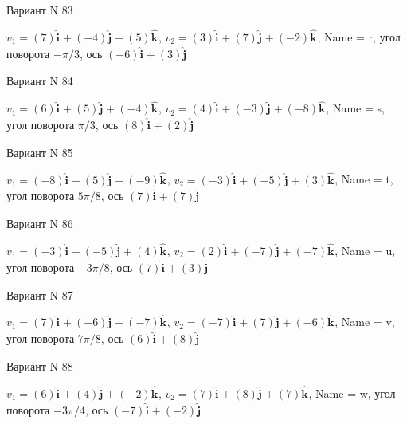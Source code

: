 \documentclass[11pt]{report}
\begin{document}
Вариант N 83

$v_1 = \left(7\right)\mathbf{\hat{i}_{}} + \left(-4\right)\mathbf{\hat{j}_{}} + \left(5\right)\mathbf{\hat{k}_{}}$, $v_2 = \left(3\right)\mathbf{\hat{i}_{}} + \left(7\right)\mathbf{\hat{j}_{}} + \left(-2\right)\mathbf{\hat{k}_{}}$, Name = r, угол поворота $- \pi / 3$, ось $\left(-6\right)\mathbf{\hat{i}_{}} + \left(3\right)\mathbf{\hat{j}_{}}$

Вариант N 84

$v_1 = \left(6\right)\mathbf{\hat{i}_{}} + \left(5\right)\mathbf{\hat{j}_{}} + \left(-4\right)\mathbf{\hat{k}_{}}$, $v_2 = \left(4\right)\mathbf{\hat{i}_{}} + \left(-3\right)\mathbf{\hat{j}_{}} + \left(-8\right)\mathbf{\hat{k}_{}}$, Name = s, угол поворота $\pi / 3$, ось $\left(8\right)\mathbf{\hat{i}_{}} + \left(2\right)\mathbf{\hat{j}_{}}$

Вариант N 85

$v_1 = \left(-8\right)\mathbf{\hat{i}_{}} + \left(5\right)\mathbf{\hat{j}_{}} + \left(-9\right)\mathbf{\hat{k}_{}}$, $v_2 = \left(-3\right)\mathbf{\hat{i}_{}} + \left(-5\right)\mathbf{\hat{j}_{}} + \left(3\right)\mathbf{\hat{k}_{}}$, Name = t, угол поворота $5 \pi / 8$, ось $\left(7\right)\mathbf{\hat{i}_{}} + \left(7\right)\mathbf{\hat{j}_{}}$

Вариант N 86

$v_1 = \left(-3\right)\mathbf{\hat{i}_{}} + \left(-5\right)\mathbf{\hat{j}_{}} + \left(4\right)\mathbf{\hat{k}_{}}$, $v_2 = \left(2\right)\mathbf{\hat{i}_{}} + \left(-7\right)\mathbf{\hat{j}_{}} + \left(-7\right)\mathbf{\hat{k}_{}}$, Name = u, угол поворота $- 3 \pi / 8$, ось $\left(7\right)\mathbf{\hat{i}_{}} + \left(3\right)\mathbf{\hat{j}_{}}$

Вариант N 87

$v_1 = \left(7\right)\mathbf{\hat{i}_{}} + \left(-6\right)\mathbf{\hat{j}_{}} + \left(-7\right)\mathbf{\hat{k}_{}}$, $v_2 = \left(-7\right)\mathbf{\hat{i}_{}} + \left(7\right)\mathbf{\hat{j}_{}} + \left(-6\right)\mathbf{\hat{k}_{}}$, Name = v, угол поворота $7 \pi / 8$, ось $\left(6\right)\mathbf{\hat{i}_{}} + \left(8\right)\mathbf{\hat{j}_{}}$

Вариант N 88

$v_1 = \left(6\right)\mathbf{\hat{i}_{}} + \left(4\right)\mathbf{\hat{j}_{}} + \left(-2\right)\mathbf{\hat{k}_{}}$, $v_2 = \left(7\right)\mathbf{\hat{i}_{}} + \left(8\right)\mathbf{\hat{j}_{}} + \left(7\right)\mathbf{\hat{k}_{}}$, Name = w, угол поворота $- 3 \pi / 4$, ось $\left(-7\right)\mathbf{\hat{i}_{}} + \left(-2\right)\mathbf{\hat{j}_{}}$
\end{document}
